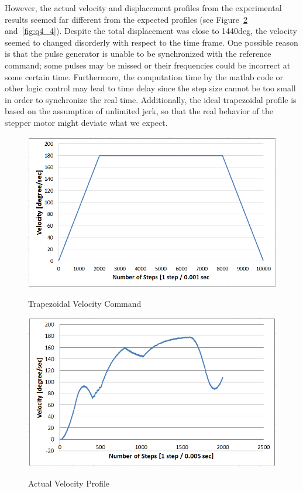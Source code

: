\documentclass{article}
\theoremstyle{plain}
\theoremstyle{definition}
\theoremstyle{remark}
\begin{document}
However, the actual velocity and displacement profiles from the experimental results seemed far different from the expected profiles (see Figure~\ref{fig:q4_3} and~\ref{fig:q4_4}). Despite the total displacement was close to 1440deg, the velocity seemed to changed disorderly with respect to the time frame. One possible reason is that the pulse generator is unable to be synchronized with the reference command; some pulses may be missed or their frequencies could be incorrect at some certain time. Furthermore, the computation time by the matlab code or other logic control may lead to time delay since the step size cannot be too small in order to synchronize the real time. Additionally, the ideal trapezoidal profile is based on the assumption of unlimited jerk, so that the real behavior of the stepper motor might deviate what we expect.\\

\begin{figure}[h!]
\begin{center}
\includegraphics[width=12cm]{Q4_CommandGeneration.png}
\caption{Trapezoidal Velocity Command} \label{tex}
\label{fig:q4_2}
\end{center}
\end{figure}

\begin{figure}[b!]
\begin{center}
\includegraphics[width=12cm]{Q4_Trapezoid_Velocity_Fail.png}
\caption{Actual Velocity Profile} \label{tex}
\label{fig:q4_3}
\end{center}
\end{figure}
  
\end{document}
